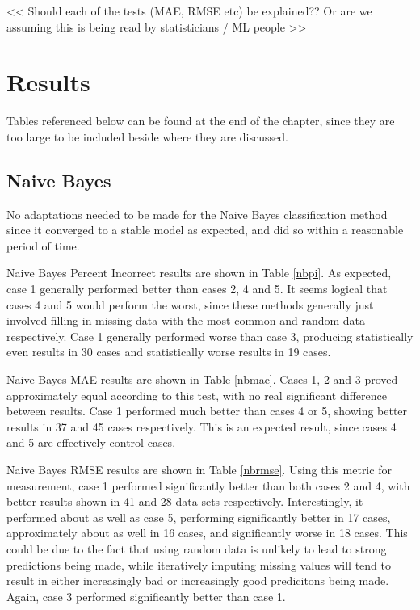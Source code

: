 << Should each of the tests (MAE, RMSE etc) be explained?? Or are we assuming this is being read by statisticians / ML people >>

\section{Results}

Tables referenced below can be found at the end of the chapter, since they are too large to be included beside where they are discussed.

\subsection{Naive Bayes}
No adaptations needed to be made for the Naive Bayes classification method since it converged to a stable model as expected, and did so within a reasonable period of time.

Naive Bayes Percent Incorrect results are shown in Table \ref{nbpi}. As expected, case 1 generally performed better than cases 2, 4 and 5. It seems logical that cases 4 and 5 would perform the worst, since these methods generally just involved filling in missing data with the most common and random data respectively. Case 1 generally performed worse than case 3, producing statistically even results in 30 cases and statistically worse results in 19 cases.

Naive Bayes MAE results are shown in Table \ref{nbmae}. Cases 1, 2 and 3 proved approximately equal according to this test, with no real significant difference between results. Case 1 performed much better than cases 4 or 5, showing better results in 37 and 45 cases respectively. This is an expected result, since cases 4 and 5 are effectively control cases.

Naive Bayes RMSE results are shown in Table \ref{nbrmse}. Using this metric for measurement, case 1 performed significantly better than both cases 2 and 4, with better results shown in 41 and 28 data sets respectively. Interestingly, it performed about as well as case 5, performing significantly better in 17 cases, approximately about as well in 16 cases, and significantly worse in 18 cases. This could be due to the fact that using random data is unlikely to lead to strong predictions being made, while iteratively imputing missing values will tend to result in either increasingly bad or increasingly good predicitons being made. Again, case 3 performed significantly better than case 1.

